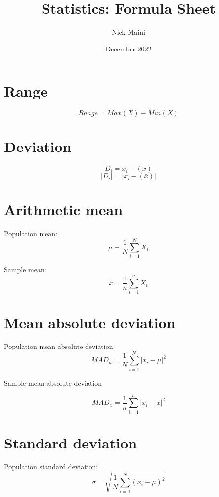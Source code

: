 \documentclass{article}
\title{Statistics: Formula Sheet}
\author{Nick Maini}
\date{December 2022}
\begin{document}
\maketitle

\section*{Range}
\[
Range = Max(X) - Min(X)
\]
\hspace{0.5cm}

\section*{Deviation}

\[
D_i = x_i- (\bar{x})
\]
\[
|D_i| = |x_i- (\bar{x})|
\]

\hspace{0.5cm}

\section*{Arithmetic mean}
\hspace{0.5cm}


Population mean:
\[
\mu = \frac{1}{N}\sum_{i=1}^{N} X_{i} 
\] 

Sample mean:
\[
\bar{x}=\frac{1}{n}\sum_{i=1}^{n} X_{i} 
\]

\newpage

\section*{Mean absolute deviation}
\hspace{0.5cm}



Population mean absolute deviation
\[
MAD_\mu = \frac{1}{N} \sum_{i=1}^N |x_i - \mu|^2
\]

Sample mean absolute deviation

\[
MAD_{\bar{x}} = \frac{1}{n} \sum_{i=1}^n |x_i - \bar{x}|^2
\]

\hspace{0.5cm}



\section*{Standard deviation}
\hspace{0.5cm}

Population standard deviation:
\[
\sigma = \sqrt{\frac{1}{N} \sum_{i=1}^N (x_i - \mu)^2}
\]
\end{document}
